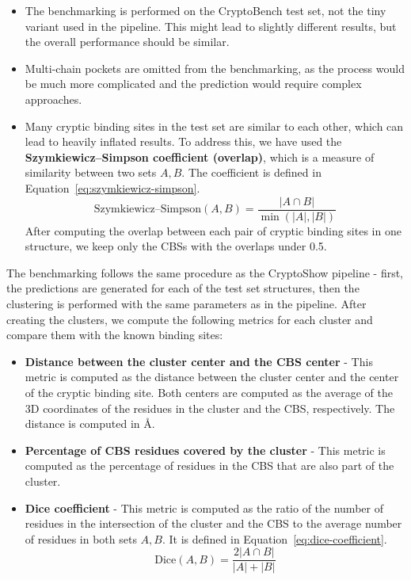 \begin{itemize}
    \item The benchmarking is performed on the CryptoBench test set, not the tiny variant used in the pipeline. This might lead to slightly different results, but the overall performance should be similar.
    \item Multi-chain pockets are omitted from the benchmarking, as the process would be much more complicated and the prediction would require complex approaches.
    \item Many cryptic binding sites in the test set are similar to each other, which can lead to heavily inflated results. To address this, we have used the \textbf{Szymkiewicz–Simpson coefficient (overlap)}, which is a measure of similarity between two sets $A, B$. The coefficient is defined in Equation~\ref{eq:szymkiewicz-simpson}.
    \begin{equation}
        \text{Szymkiewicz–Simpson}(A, B) = \frac{|A \cap B|}{\min(|A|, |B|)}
        \label{eq:szymkiewicz-simpson}
    \end{equation}
    After computing the overlap between each pair of cryptic binding sites in one structure, we keep only the CBSs with the overlaps under 0.5.
\end{itemize}

The benchmarking follows the same procedure as the CryptoShow pipeline - first, the predictions are generated for each of the test set structures, then the clustering is performed with the same parameters as in the pipeline. After creating the clusters, we compute the following metrics for each cluster and compare them with the known binding sites:

\begin{itemize}
    \item \textbf{Distance between the cluster center and the CBS center} - This metric is computed as the distance between the cluster center and the center of the cryptic binding site. Both centers are computed as the average of the 3D coordinates of the residues in the cluster and the CBS, respectively. The distance is computed in \AA.
    \item \textbf{Percentage of CBS residues covered by the cluster} - This metric is computed as the percentage of residues in the CBS that are also part of the cluster.
    \item \textbf{Dice coefficient} - This metric is computed as the ratio of the number of residues in the intersection of the cluster and the CBS to the average number of residues in both sets $A, B$. It is defined in Equation~\ref{eq:dice-coefficient}.
    \begin{equation}
        \text{Dice}(A, B) = \frac{2 |A \cap B|}{|A| + |B|}
        \label{eq:dice-coefficient}
    \end{equation}
\end{itemize}

